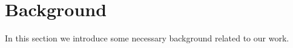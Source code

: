 \documentclass[conference]{IEEEtran}
\newcommand{\cp}[1]{\footnote{{\bf Carlos: #1}}}
\begin{document}
%



\section{Background}

In this section we introduce some necessary background related to our
work. 

\end{document}
